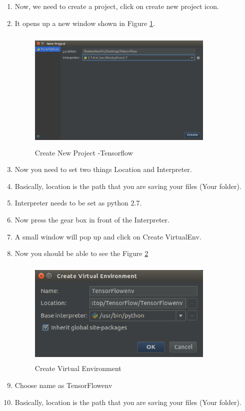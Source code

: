 \documentclass[12pt]{article}
\begin{document}
\begin{enumerate}
  \item Now, we need to create a project, click on create new project icon.
  \item It opens up a new window shown in Figure \ref{fig:3_1}.
\begin{figure}[h]
	\centerline{\includegraphics[width=3.5in, height=2.3in]{fig/8.eps}}
	\caption{Create New Project -Tensorflow}
	\label{fig:3_1}
\end{figure}
  \item Now you need to set two things Location and Interpreter.
  \item Basically, location is the path that you are saving your files (Your folder).
  \item Interpreter needs to be set as python 2.7.
  \item Now press the gear box in front of the Interpreter.
  \item A small window will pop up and click on Create VirtualEnv.
  \item Now you should be able to see the Figure \ref{fig:10}
\begin{figure}[h]
	\centerline{\includegraphics[width=3.5in, height=2in]{fig/10.eps}}
	\caption{Create Virtual Environment}
	\label{fig:10}
\end{figure}
  \item Choose name as TensorFlowenv
  \item Basically, location is the path that you are saving your files (Your folder).

\end{enumerate}
\end{document}
